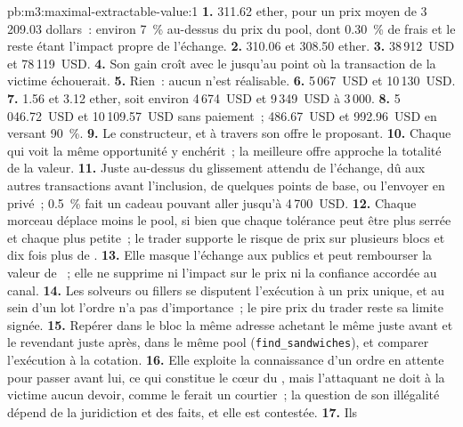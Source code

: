 \begin{solution}{pb:m3:maximal-extractable-value:1}
\textbf{1.} 311.62 ether, pour un prix moyen de 3\,209.03 dollars~: environ 7~\% au-dessus du prix du pool, dont 0.30~\% de frais et
le reste étant l'impact propre de l'échange. \textbf{2.} 310.06 et 308.50 ether. \textbf{3.} 38\,912~USD et 78\,119~USD. \textbf{4.} Son
gain croît avec le  jusqu'au point où la transaction de la victime échouerait. \textbf{5.} Rien~: aucun  n'est réalisable.
\textbf{6.} 5\,067~USD et 10\,130~USD. \textbf{7.} 1.56 et 3.12 ether, soit environ 4\,674~USD et 9\,349~USD à 3\,000. \textbf{8.}
5\,046.72~USD et 10\,109.57~USD sans paiement~; 486.67~USD et 992.96~USD en versant 90~\%. \textbf{9.} Le constructeur, et à travers son
offre le  proposant. \textbf{10.} Chaque  qui voit la même opportunité y enchérit~; la meilleure offre approche
la totalité de la valeur. \textbf{11.} Juste au-dessus du glissement attendu de l'échange, dû aux autres transactions avant l'inclusion, de quelques points de base, ou
l'envoyer en privé~; 0.5~\% fait un cadeau pouvant aller jusqu'à 4\,700~USD. \textbf{12.} Chaque morceau déplace moins le pool, si bien que chaque tolérance peut être
plus serrée et chaque  plus petite~; le trader supporte le risque de prix sur plusieurs blocs et dix fois plus de . \textbf{13.} Elle masque
l'échange aux  publics et peut rembourser la valeur de ~; elle ne supprime ni l'impact sur le prix ni la confiance accordée au canal.
\textbf{14.} Les solveurs ou fillers se disputent l'exécution à un prix unique, et au sein d'un lot l'ordre n'a pas d'importance~; le pire
prix du trader reste sa limite signée. \textbf{15.} Repérer dans le bloc la même adresse achetant le même  juste avant et
le revendant juste après, dans le même pool (\texttt{find\_sandwiches}), et comparer l'exécution à la cotation. \textbf{16.} Elle exploite
la connaissance d'un ordre en attente pour passer avant lui, ce qui constitue le cœur du , mais l'attaquant ne doit à la victime aucun
devoir, comme le ferait un courtier~; la question de son illégalité dépend de la juridiction et des faits, et elle est contestée. \textbf{17.} Ils

\end{solution}
